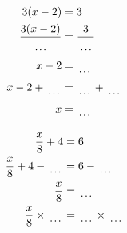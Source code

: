 \documentclass[12pt]{article}
\newcounter{minipagecount}
\begin{document}
\begin{multicols}{2}
\begin{minipage}[t]{0.45\textwidth}
    \raggedright %
    \begin{align*} %
        3(x - 2) &= 3\\
        \frac{3(x-2)}{\dotuline{\hspace{5mm}}} &= \frac{3}{\dotuline{\hspace{5mm}}}\\
        x - 2 &= \dotuline{\hspace{5mm}}\\
        x - 2 + \dotuline{\hspace{5mm}} &= \dotuline{\hspace{5mm}} + \dotuline{\hspace{5mm}}\\
        x &= \dotuline{\hspace{5mm}}\\
    \end{align*}
\end{minipage} %
\noindent{(\theminipagecount)}\hspace{0.1mm} %
\begin{minipage}[t]{0.45\textwidth} %
    \vspace{-26pt}  %
    \raggedright %
    \begin{align*} %
        \frac{x}{8} + 4 &= 6\\
        \frac{x}{8} + 4 - \dotuline{\hspace{5mm}} &= 6 - \dotuline{\hspace{5mm}}\\
        \frac{x}{8} &= \dotuline{\hspace{5mm}}\\
        \frac{x}{8} \times\dotuline{\hspace{5mm}} &= \dotuline{\hspace{5mm}} \times\dotuline{\hspace{5mm}}\\

\end{align*}
\end{minipage}
\end{multicols}
\end{document}
